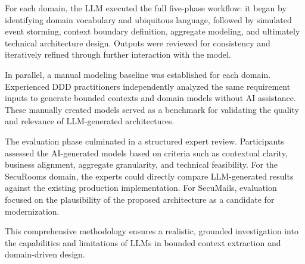 For each domain, the LLM executed the full five-phase workflow: it began by identifying domain vocabulary and ubiquitous language, followed by simulated event storming, context boundary definition, aggregate modeling, and ultimately technical architecture design. Outputs were reviewed for consistency and iteratively refined through further interaction with the model.

In parallel, a manual modeling baseline was established for each domain. Experienced DDD practitioners independently analyzed the same requirement inputs to generate bounded contexts and domain models without AI assistance. These manually created models served as a benchmark for validating the quality and relevance of LLM-generated architectures.

The evaluation phase culminated in a structured expert review. Participants assessed the AI-generated models based on criteria such as contextual clarity, business alignment, aggregate granularity, and technical feasibility. For the SecuRooms domain, the experts could directly compare LLM-generated results against the existing production implementation. For SecuMails, evaluation focused on the plausibility of the proposed architecture as a candidate for modernization.

This comprehensive methodology ensures a realistic, grounded investigation into the capabilities and limitations of LLMs in bounded context extraction and domain-driven design.
